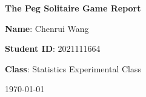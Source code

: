 \documentclass[titlepage,12pt]{article}
\begin{document}
    \begin{titlepage}
        \centering
        \vspace*{3cm}
        {\LARGE \textbf{The Peg Solitaire Game Report}\par}
        \vspace{2cm}
        {\large \textbf{Name}: Chenrui Wang \par}
        \vspace{0.5cm}
        {\large \textbf{Student ID}: 2021111664 \par}
        \vspace{0.5cm}
        {\large \textbf{Class}: Statistics Experimental Class \par}
        \vspace{2cm}
        {\large \today\par}
        \vfill
    \end{titlepage}

    
    
    

    
    
\end{document}
